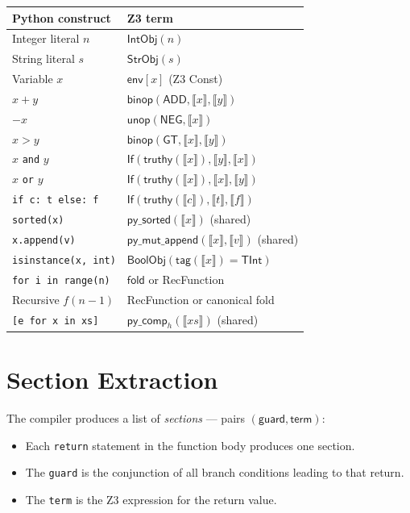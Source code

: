 \documentclass[11pt,a4paper]{report}
\theoremstyle{definition}
\theoremstyle{plain}
\newcommand{\den}[1]{\llbracket #1 \rrbracket}
\newcommand{\fold}{\mathsf{fold}}
\begin{document}
\begin{center}
\small
\begin{tabular}{l l}
  \textbf{Python construct} & \textbf{Z3 term} \\
  \hline
  Integer literal $n$ & $\mathsf{IntObj}(n)$ \\
  String literal $s$ & $\mathsf{StrObj}(s)$ \\
  Variable $x$ & $\mathsf{env}[x]$ (Z3 Const) \\
  $x + y$ & $\mathsf{binop}(\mathsf{ADD}, \den{x}, \den{y})$ \\
  $-x$ & $\mathsf{unop}(\mathsf{NEG}, \den{x})$ \\
  $x > y$ & $\mathsf{binop}(\mathsf{GT}, \den{x}, \den{y})$ \\
  $x$ \texttt{and} $y$ & $\mathsf{If}(\mathsf{truthy}(\den{x}), \den{y}, \den{x})$ \\
  $x$ \texttt{or} $y$ & $\mathsf{If}(\mathsf{truthy}(\den{x}), \den{x}, \den{y})$ \\
  \texttt{if c: t else: f} & $\mathsf{If}(\mathsf{truthy}(\den{c}), \den{t}, \den{f})$ \\
  \texttt{sorted(x)} & $\mathsf{py\_sorted}(\den{x})$ (shared) \\
  \texttt{x.append(v)} & $\mathsf{py\_mut\_append}(\den{x}, \den{v})$ (shared) \\
  \texttt{isinstance(x, int)} & $\mathsf{BoolObj}(\mathsf{tag}(\den{x}) = \mathsf{TInt})$ \\
  \texttt{for i in range(n)} & $\fold$ or RecFunction \\
  Recursive $f(n-1)$ & RecFunction or canonical fold \\
  \texttt{[e for x in xs]} & $\mathsf{py\_comp}_h(\den{xs})$ (shared) \\
\end{tabular}
\end{center}

\section{Section Extraction}

The compiler produces a list of \emph{sections} --- pairs
$(\mathsf{guard}, \mathsf{term})$:

\begin{itemize}
  \item Each \texttt{return} statement in the function body produces
    one section.
  \item The \texttt{guard} is the conjunction of all branch conditions
    leading to that return.
  \item The \texttt{term} is the Z3 expression for the return value.
\end{itemize}
\end{document}
